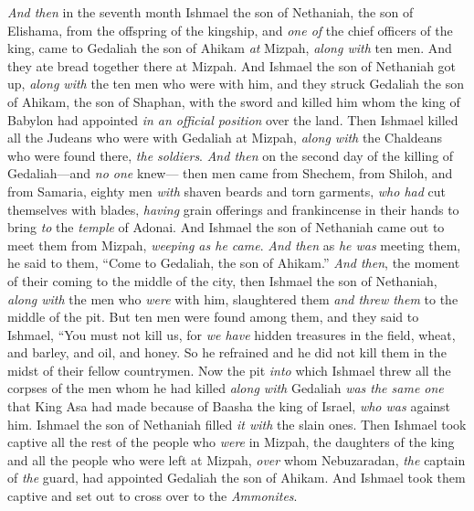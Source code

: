 \begin{biblechapter} %
\verse \textit{And then} in the seventh month Ishmael the son of Nethaniah, the son of Elishama, from the offspring of the kingship, and \textit{one of} the chief officers of the king, came to Gedaliah the son of Ahikam \textit{at} Mizpah, \textit{along with} ten men. And they ate bread together there at Mizpah.
\verse And Ishmael the son of Nethaniah got up, \textit{along with} the ten men who were with him, and they struck Gedaliah the son of Ahikam, the son of Shaphan, with the sword and killed him whom the king of Babylon had appointed \textit{in an official position} over the land.
\verse Then Ishmael killed all the Judeans who were with Gedaliah at Mizpah, \textit{along with} the Chaldeans who were found there, \textit{the soldiers}.
 \textit{And then} on the second day of the killing of Gedaliah—and \textit{no one} knew—
\verse then men came from Shechem, from Shiloh, and from Samaria, eighty men \textit{with} shaven beards and torn garments, \textit{who had} cut themselves with blades, \textit{having} grain offerings and frankincense in their hands to bring \textit{to} the \textit{temple} of Adonai.
\verse And Ishmael the son of Nethaniah came out to meet them from Mizpah, \textit{weeping as he came}. \textit{And then} as \textit{he was} meeting them, he said to them, “Come to Gedaliah, the son of Ahikam.”
\verse \textit{And then}, the moment of their coming to the middle of the city, then Ishmael the son of Nethaniah, \textit{along with} the men who \textit{were} with him, slaughtered them \textit{and threw them} to the middle of the pit.
\verse But ten men were found among them, and they said to Ishmael, “You must not kill us, for \textit{we have} hidden treasures in the field, wheat, and barley, and oil, and honey. So he refrained and he did not kill them in the midst of their fellow countrymen.
\verse Now the pit \textit{into} which Ishmael threw all the corpses of the men whom he had killed \textit{along with} Gedaliah \textit{was the same one} that King Asa had made because of Baasha the king of Israel, \textit{who was} against him. Ishmael the son of Nethaniah filled \textit{it with} the slain ones.
\verse Then Ishmael took captive all the rest of the people who \textit{were} in Mizpah, the daughters of the king and all the people who were left at Mizpah, \textit{over} whom Nebuzaradan, \textit{the} captain of \textit{the} guard, had appointed Gedaliah the son of Ahikam. And Ishmael took them captive and set out to cross over to the \textit{Ammonites}.

\end{biblechapter}
